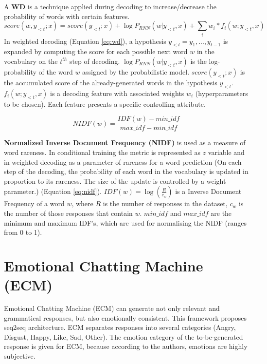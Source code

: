 A \textbf{WD} is a technique applied during decoding to increase/decrease the probability of words with certain features. 
\begin{equation} \label{eq:wd}
score(w, y_{<t}; x) = score(y_{<t}; x) + \log P_{RNN}(w|y_{<t}, x) + \sum_i w_i * f_i(w; y_{<t}, x)
\end{equation}
In weighted decoding (Equation \ref{eq:wd}), a hypothesis $y_{<t} = y_1, ..., y_{t-1}$ is expanded by computing the score for each possible next word $w$ in the vocabulary on the $t^{th}$ step of decoding. $\log P_{RNN}(w|y_{<t}, x)$ is the log-probability of the word $w$ assigned by the probabilistic model. $score(y_{<t}; x)$ is the accumulated score of the already-generated words in the hypothesis $y_{<t}$. $f_i(w; y_{<t}, x)$ is a decoding feature with associated weights $w_i$ (hyperparameters to be chosen). Each feature presents a specific controlling attribute.

\begin{equation} \label{eq:nidf}
NIDF(w) = \frac{IDF(w) - min\_idf}{max\_idf - min\_idf}
\end{equation}

\textbf{Normalized Inverse Document Frequency (NIDF)} is used as a measure of word rareness. In conditional training the metric is represented as $z$ variable and in weighted decoding as a parameter of rareness for a word prediction (On each step of the decoding, the probability of each word in the vocabulary is updated in proportion to its rareness. The size of the update is controlled by a weight parameter.) (Equation \ref{eq:nidf}). $IDF(w) = \log(\frac{R}{c_w})$ is a Inverse Document Frequency of a word $w$, where $R$ is the number of responses in the dataset, $c_w$ is the number of those responses that contain $w$. $min\_idf$ and $max\_idf$ are the minimum and maximum IDF's, which are used for normalising the NIDF (ranges from 0 to 1).

\section{Emotional Chatting Machine (ECM)}
Emotional Chatting Machine (ECM) \cite{zhou2018emotional} can generate not only relevant and grammatical responses, but also emotionally consistent. This framework proposes seq2seq architecture. ECM separates responses into several categories (Angry, Disgust, Happy, Like, Sad, Other). The emotion category of the to-be-generated response is given for ECM, because according to the authors, emotions are highly subjective. 

